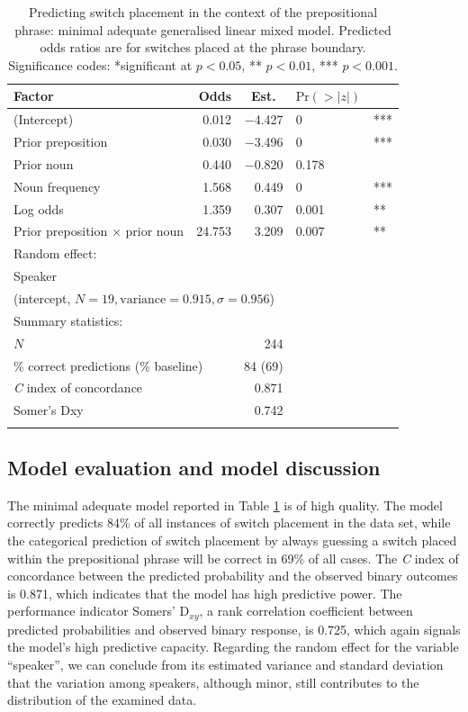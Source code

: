 \begin{table}
\begin{tabular}{l rrl l}
		 \lsptoprule
	     Factor & Odds & \multicolumn{1}{c}{Est.} & \multicolumn{1}{c}{$\text{Pr}(>|z|)$}  &\\\midrule
		(Intercept) & 0.012 & −4.427  & 0 & ***\\
		Prior preposition & 0.030 & −3.496 & 0 & ***\\
		Prior noun & 0.440 & −0.820 & 0.178 & \\ 
		Noun frequency & 1.568 & 0.449 & 0 & ***\\
		Log odds & 1.359 & 0.307 & 0.001 & **\\
		Prior preposition $\times$ prior noun & 24.753 & 3.209 & 0.007 & **\\  \midrule
		\multicolumn{5}{l}{Random effect:}\\
		\multicolumn{5}{l}{Speaker}\\
		\multicolumn{5}{l}{(intercept, $N = 19, \text{variance} = 0.915, \sigma = 0.956$)}\\
		\midrule
		\multicolumn{2}{l}{Summary statistics:}\\
		\multicolumn{2}{l}{$N$} &  244\\
		\multicolumn{2}{l}{\% correct predictions (\% baseline)}  & 84 (69)\\
		\multicolumn{2}{l}{\textit{C} index of concordance}  & 0.871\\
		\multicolumn{2}{l}{Somer's Dxy} &  0.742\\
		\lspbottomrule
\end{tabular}
	\caption{Predicting switch placement in the context of the prepositional phrase: minimal adequate generalised linear mixed model. Predicted odds ratios are for switches placed at the phrase boundary. Significance codes: *significant at $p < 0.05$, ** $p < 0.01$, *** $p < 0.001$.\label{tab:5:5}}
\end{table}

\subsection{Model evaluation and model discussion}

\noindent The minimal adequate model reported in Table  \ref{tab:5:5} is of high quality. The model correctly predicts 84\% of all instances of switch placement in the data set, while the categorical prediction of switch placement by always guessing a switch placed within the prepositional phrase will be correct in 69\% of all cases. The \textit{C} index of concordance between the predicted probability and the observed binary outcomes is 0.871, which indicates that the model has high predictive power. The performance indicator Somers' D$_{xy}$, a rank correlation coefficient between predicted probabilities and observed binary response, is 0.725, which again signals the model’s high predictive capacity. Regarding the random effect for the variable “speaker”, we can conclude from its estimated variance and standard deviation that the variation among speakers, although minor, still contributes to the distribution of the examined data.


